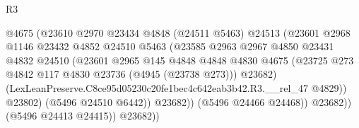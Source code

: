 \begin{lexlean}{R3}
\begin{coremodule}
                                            @4675
                                            (@23610
                                              @2970
                                              @23434
                                              @4848
                                              (@24511 @5463)
                                              @24513
                                              (@23601
                                                @2968
                                                @1146
                                                @23432
                                                @4852
                                                @24510
                                                @5463
                                                (@23585
                                                  @2963
                                                  @2967
                                                  @4850
                                                  @23431
                                                  @4832
                                                  @24510
                                                  (@23601
                                                    @2965
                                                    @145
                                                    @4848
                                                    @4848
                                                    @4830
                                                    @4675
                                                    (@23725
                                                      @273
                                                      @4842
                                                      @117
                                                      @4830
                                                      @23736
                                                      (@4945 (@23738 @273)))
                                                    @23682)
                                                  (LexLeanPreserve.C8ce95d05230c20fe1bec4c642eab3b42.R3.__rel_47
                                                    @4829))
                                                @23802)
                                              (@5496 @24510 @6442))
                                            @23682))
                                        (@5496 @24466 @24468))
                                      @23682))
                                  (@5496 @24413 @24415))
                                @23682))

\end{coremodule}
\end{lexlean}
